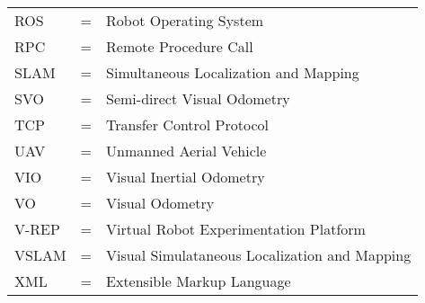 \begin{center}
\begin{tabular}{ l c l }
    ROS & = & Robot Operating System \\
    RPC & = & Remote Procedure Call \\
    SLAM & = & Simultaneous Localization and Mapping \\
    SVO & = & Semi-direct Visual Odometry \\
    TCP & = & Transfer Control Protocol \\
    UAV & = & Unmanned Aerial Vehicle \\
    VIO & = & Visual Inertial Odometry \\
    VO & = & Visual Odometry \\
    V-REP & = & Virtual Robot Experimentation Platform \\
    VSLAM & = & Visual Simulataneous Localization and Mapping \\
    XML & = & Extensible Markup Language \\
\end{tabular}
\end{center}

\cleardoublepage

\pagestyle{fancy}
\fancyhf{}
\renewcommand{\chaptermark}[1]{\markboth{\chaptername\ \thechapter.\ #1}{}}
\renewcommand{\sectionmark}[1]{\markright{\thesection\ #1}}
\renewcommand{\headrulewidth}{0.1ex}
\renewcommand{\footrulewidth}{0.1ex}
\fancyfoot[LE,RO]{\thepage}
\fancyhead[LE]{\leftmark}
\fancyhead[RO]{\rightmark}
\fancypagestyle{plain}{\fancyhf{}\fancyfoot[LE,RO]{\thepage}\renewcommand{\headrulewidth}{0ex}}

\setcounter{page}{1}